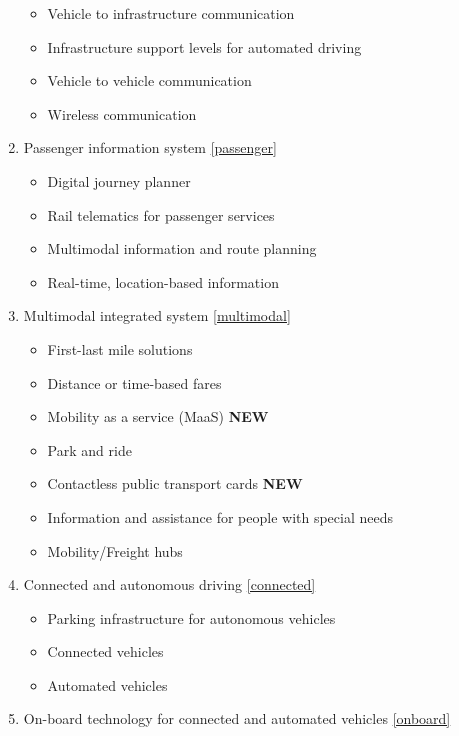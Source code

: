 \documentclass[
]{book}
\providecommand{\tightlist}{%
  \setlength{\itemsep}{0pt}\setlength{\parskip}{0pt}}
\begin{document}
\begin{enumerate}
  \begin{itemize}
  \tightlist
  \item
    Vehicle to infrastructure communication
  \item
    Infrastructure support levels for automated driving
  \item
    Vehicle to vehicle communication
  \item
    Wireless communication
  \end{itemize}
\item
  Passenger information system \ref{passenger}

  \begin{itemize}
  \tightlist
  \item
    Digital journey planner
  \item
    Rail telematics for passenger services
  \item
    Multimodal information and route planning
  \item
    Real-time, location-based information
  \end{itemize}
\item
  Multimodal integrated system \ref{multimodal}

  \begin{itemize}
  \tightlist
  \item
    First-last mile solutions
  \item
    Distance or time-based fares
  \item
    Mobility as a service (MaaS) \textbf{NEW}
  \item
    Park and ride
  \item
    Contactless public transport cards \textbf{NEW}
  \item
    Information and assistance for people with special needs
  \item
    Mobility/Freight hubs
  \end{itemize}
\item
  Connected and autonomous driving \ref{connected}

  \begin{itemize}
  \tightlist
  \item
    Parking infrastructure for autonomous vehicles
  \item
    Connected vehicles
  \item
    Automated vehicles
  \end{itemize}
\item
  On-board technology for connected and automated vehicles \ref{onboard}


\end{enumerate}
\end{document}
